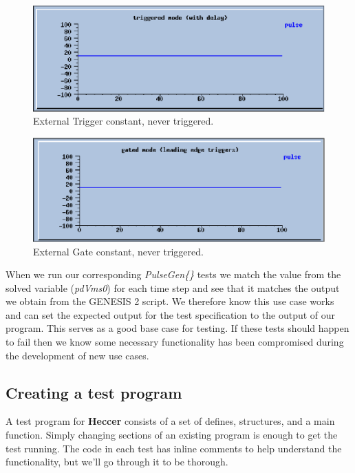 \documentclass[12pt]{article}
\begin{document}
\begin{figure}[ht]
  \centering
    \includegraphics[scale=0.6]{figures/pulse1.eps}
  \caption{External Trigger constant, never triggered.}
\end{figure}

\begin{figure}[ht]
  \centering
    \includegraphics[scale=0.6]{figures/pulse2.eps}
  \caption{External Gate constant, never triggered.}
\end{figure}

When we run our corresponding {\it PulseGen\{\}} tests we match the value from the solved variable ({\it pdVms0}) for each time step and see that it matches the output we obtain from the GENESIS 2 script. We therefore know this use case works and can set the expected output for the test specification to the output of our program. This serves as a good base case for testing. If these tests should happen to fail then we know some necessary functionality has been compromised during the development of new use cases.

\subsection*{Creating a test program}

A test program for {\bf Heccer} consists of a set of defines, structures, and a main function. Simply changing sections of an existing program is enough to get the test running. The code in each test has inline comments to help understand the functionality, but we'll go through it to be thorough.
\end{document}
